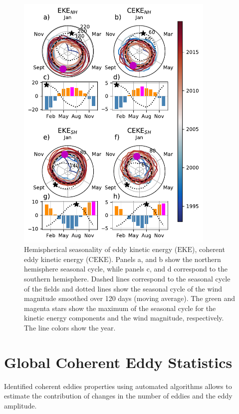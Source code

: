 \documentclass[draft,linenumbers]{agujournal2019}
\newcommand{\EKE}{\textrm{EKE}}
\newcommand{\CEKE}{\textrm{CEKE}}
\begin{document}
	\begin{figure}
	    \centering
	    \includegraphics[width=95mm]{figures/All_polar_plots.pdf}
	    \caption{Hemispherical seasonality of eddy kinetic energy ($\EKE$), coherent eddy kinetic energy ($\CEKE$). 
		Panels a, and b show the northern hemisphere seasonal cycle, while panels c, and d correspond to the southern hemisphere. Dashed lines correspond to the seasonal cycle of the fields and dotted lines show the seasonal cycle of the wind magnitude smoothed over 120 days (moving average). 
		The green and magenta stars show the maximum of the seasonal cycle for the kinetic energy components and the wind magnitude, respectively. The line colors show the year.}
	    \label{fig:eddy_energy_polar}
	\end{figure}
	
	\section{Global Coherent Eddy Statistics}
	\label{subsec:CE_stats}

	Identified coherent eddies properties using automated algorithms allows to estimate the contribution of changes in the number of eddies and the eddy amplitude. 
	
\end{document}
